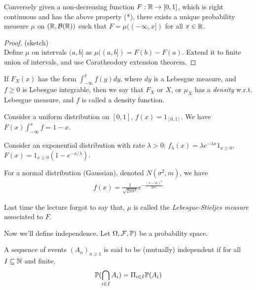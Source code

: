 \documentclass[a4paper]{article}
\begin{document}
\begin{thm}
Conversely given a non-decreasing function $F:\R \to [0,1]$, which is right continuous and has the above property (*), there exists a unique probability measure $\mu$ on $(\R,\mathcal{B}(\R))$ such that $F = \mu((-\infty,x])$ for all $x \in \R$.
\begin{proof} (sketch)\\
Define $\mu$ on intervals $(a,b]$ as $\mu((a,b]) = F(b) - F(a)$. Extend it to finite union of intervals, and use Caratheodory extension theorem.

\end{proof}
\end{thm}

\begin{defi}
If $F_X(x)$ has the form $\int_{-\infty}^x f(y) dy$, where $dy$ is a Lebesgue measure, and $f \geq 0$ is Lebesgue integrable, then we say that $F_X$ or $X$, or $\mu_X$ has a \emph{density} w.r.t. Lebesgue measure, and $f$ is called a density function.
\end{defi}

\begin{eg}
Consider a uniform distribution on $[0,1]$, $f(x) = 1_{[0,1]}$. We have $F(x) \int_{-\infty}^x f = 1-x$.
\end{eg}

\begin{eg}
Consider an exponential distribution with rate $\lambda > 0$: $f_\lambda (x) = \lambda e^{-\lambda x} 1_{x \geq 0}$, $F(x) = 1_{x \geq 0} (1-e^{-x/\lambda})$.
\end{eg}

\begin{eg}
For a normal distribution (Gaussian), denoted $N(\sigma^2,m)$, we have
\begin{equation*}
\begin{aligned}
f(x) = \frac{1}{\sqrt{2\pi \sigma^2}} e^{-\frac{(x-m)^2}{2\sigma^2}}
\end{aligned}
\end{equation*}
\end{eg}

Last time the lecture forgot to say that, $\mu$ is called the \emph{Lebesgue-Stieljes measure} associated to $F$.

Now we'll define independence. Let $\Omega, \mathcal{F},\P)$ be a probability space.

\begin{defi}
A sequence of events $(A_n)_{n \geq 1}$ is said to be (mutually) independent if for all $I \subseteq \N$ and finite,
\begin{equation*}
\begin{aligned}
\P(\bigcap_{i \in I} A_i) = \Pi_{i \in I} \P(A_i)
\end{aligned}
\end{equation*}
\end{defi}
\end{document}
